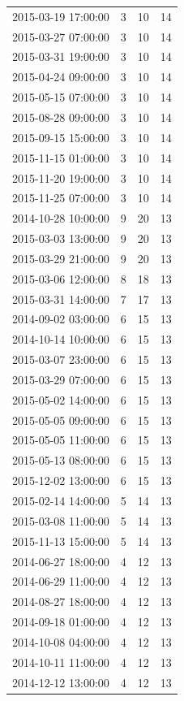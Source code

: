 \begin{tabular}{lrrr}
2015-03-19 17:00:00 & 3 & 10 & 14 \\
2015-03-27 07:00:00 & 3 & 10 & 14 \\
2015-03-31 19:00:00 & 3 & 10 & 14 \\
2015-04-24 09:00:00 & 3 & 10 & 14 \\
2015-05-15 07:00:00 & 3 & 10 & 14 \\
2015-08-28 09:00:00 & 3 & 10 & 14 \\
2015-09-15 15:00:00 & 3 & 10 & 14 \\
2015-11-15 01:00:00 & 3 & 10 & 14 \\
2015-11-20 19:00:00 & 3 & 10 & 14 \\
2015-11-25 07:00:00 & 3 & 10 & 14 \\
2014-10-28 10:00:00 & 9 & 20 & 13 \\
2015-03-03 13:00:00 & 9 & 20 & 13 \\
2015-03-29 21:00:00 & 9 & 20 & 13 \\
2015-03-06 12:00:00 & 8 & 18 & 13 \\
2015-03-31 14:00:00 & 7 & 17 & 13 \\
2014-09-02 03:00:00 & 6 & 15 & 13 \\
2014-10-14 10:00:00 & 6 & 15 & 13 \\
2015-03-07 23:00:00 & 6 & 15 & 13 \\
2015-03-29 07:00:00 & 6 & 15 & 13 \\
2015-05-02 14:00:00 & 6 & 15 & 13 \\
2015-05-05 09:00:00 & 6 & 15 & 13 \\
2015-05-05 11:00:00 & 6 & 15 & 13 \\
2015-05-13 08:00:00 & 6 & 15 & 13 \\
2015-12-02 13:00:00 & 6 & 15 & 13 \\
2015-02-14 14:00:00 & 5 & 14 & 13 \\
2015-03-08 11:00:00 & 5 & 14 & 13 \\
2015-11-13 15:00:00 & 5 & 14 & 13 \\
2014-06-27 18:00:00 & 4 & 12 & 13 \\
2014-06-29 11:00:00 & 4 & 12 & 13 \\
2014-08-27 18:00:00 & 4 & 12 & 13 \\
2014-09-18 01:00:00 & 4 & 12 & 13 \\
2014-10-08 04:00:00 & 4 & 12 & 13 \\
2014-10-11 11:00:00 & 4 & 12 & 13 \\
2014-12-12 13:00:00 & 4 & 12 & 13 \\

\end{tabular}
